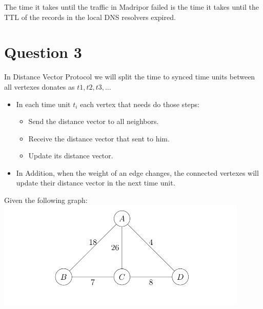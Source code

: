 \documentclass{article}
\begin{document}
The time it takes until the traffic in Madripor failed is the time it takes until the TTL of the records in the local DNS resolvers expired.
\section{Question 3}

In Distance Vector Protocol we will split the time to synced time units between all vertexes donates as $t1, t2, t3,\dots$ 
\begin{itemize}
    \item In each time unit $t_i$ each vertex that needs do those steps:
    \begin{itemize}
        \item Send the distance vector to all neighbors.
            \item Receive the distance vector that sent to him.
            \item Update its distance vector.
    \end{itemize}           
    \item In Addition, when the weight of an edge changes, the connected vertexes will update their distance vector in the next time unit.
\end{itemize}
Given the following graph: \\
\includegraphics[width=0.9\textwidth]{Screenshot 2024-06-28 at 14.59.41.png}
\end{document}
